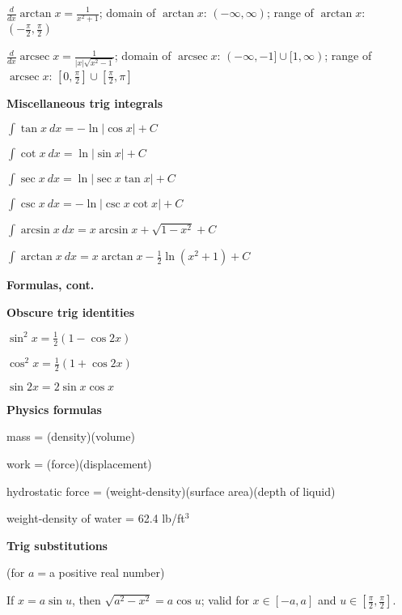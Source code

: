 \documentclass[12pt, addpoints]{exam/exam}
\newcommand{\1}{^{-1}}
\DeclareMathOperator{\arcsec}{arcsec}
\theoremstyle{plain}
\begin{document}
\begin{coverpages}
$\frac{d}{dx}\arctan x=\frac{1}{x^2+1}$; domain of $\arctan x$: $(-\infty, \infty)$; range of $\arctan x$: $(-\frac{\pi}{2},\frac{\pi}{2})$

$\frac{d}{dx}\arcsec x=\frac{1}{|x|\sqrt{x^2-1}}$; domain of $\arcsec x$: $(-\infty,-1]\cup [1,\infty)$; range of $\arcsec x$: $[0,\frac{\pi}{2}]\cup [\frac{\pi}{2},\pi]$

\vspace{2pc}
\textbf{Miscellaneous trig integrals}
\vspace{0.5pc}

$\int \tan x\ dx=-\ln|\cos x|+C$

$\int \cot x\ dx=\ln|\sin x|+C$

$\int \sec x\ dx=\ln|\sec x\tan x|+C$

$\int \csc x\ dx=-\ln|\csc x\cot x|+C$

$\int \arcsin x\ dx=x\arcsin x+\sqrt{1-x^2}+C$

$\int \arctan x\ dx=x\arctan x-\frac{1}{2}\ln(x^2+1)+C$

\vfill
\gradetable 

\newpage
\textbf{\large Formulas, cont.}

\vspace{1pc}
\textbf{Obscure trig identities}
\vspace{0.5pc}

$\sin^2x=\frac{1}{2}(1-\cos{2x})$

\vspace{0.25pc}
$\cos^2x=\frac{1}{2}(1+\cos{2x})$

\vspace{0.7pc}
$\sin{2x}=2\sin x\cos x$

\vspace{2pc}
\textbf{Physics formulas}
\vspace{0.5pc}

mass = (density)(volume)

work = (force)(displacement)

hydrostatic force = (weight-density)(surface area)(depth of liquid)

weight-density of water = 62.4 lb/ft$^3$

\vspace{2pc}
\textbf{Trig substitutions}
\vspace{0.5pc}

(for $a=$a positive real number)

\vspace{0.5pc}
If $x=a\sin u$, then $\sqrt{a^2-x^2}=a\cos u$; valid for $x\in[-a,a]$ and $\textstyle u\in\left[\frac{\pi}{2},\frac{\pi}{2}\right]$.


\end{coverpages}
\end{document}
